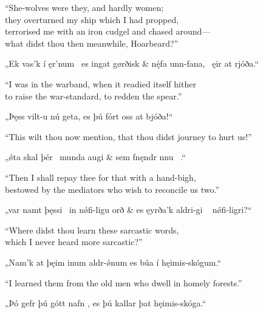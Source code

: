 \bvb%
“She-wolves were they, and hardly women; \\
they overturned my ship which I had propped, \\
terrorised me with an iron cudgel and chased  around— \\
\ind what didst thou then meanwhile, Hoarbeard?”\evb\evg


\bvg\bva{}%
„Ek vas’k í ęr’num \hld\ es ingat gørðisk &
nę́fa unn-fana, \hld\ ęir at rjóða.“\eva

\bvb%
“I was in the warband, when it readied itself hither \\
to raise the war-standard, to redden the spear.”\evb\evg


\bvg\bva{}%
„Þęss vilt-u nú geta, es þú fórt oss  at bjóða!“\eva

\bvb%
“This wilt thou now mention, that thou didst journey to hurt us!”\evb\evg


\bvg\bva{}%
„ǿta skal þér  \hld\ munda augi &
sem fnęndr nnu \hld\ .“\eva

\bvb%
“Then I shall repay thee for that with a hand-bigh, \\
bestowed by the mediators who wish to reconcile us two.”\evb\evg


\bvg\bva{}%
„var namt þęssi \hld\ in nǿfi-ligu orð &
es ęyrða’k aldri-gi \hld\  nǿfi-ligri?“\eva

\bvb%
“Where didst thou learn these sarcastic words, \\
which I never heard more sarcastic?”\evb\evg


\bvg\bva{}%
„Nam’k at  þęim inum aldr-ǿnum es búa í hęimis-skógum.“\eva

\bvb%
“I learned them from the old men who dwell in homely forests.”\evb\evg


\bvg\bva{}%
„Þó gefr þú gótt nafn , es þú kallar þat hęimis-skóga.“\eva

